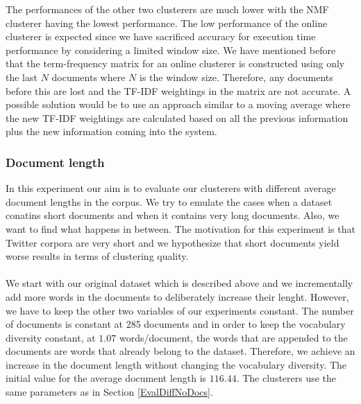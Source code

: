 The performances of the other two clusterers are much lower with the NMF clusterer having the lowest performance. The low performance of the online clusterer is expected since we have sacrificed accuracy for execution time performance by considering a limited window size. We have mentioned before that the term-frequency matrix for an online clusterer is constructed using only the last $N$ documents where $N$ is the window size. Therefore, any documents before this are lost and the TF-IDF weightings in the matrix are not accurate. A possible solution would be to use an approach similar to a moving average where the new TF-IDF weightings are calculated based on all the previous information plus the new information coming into the system.   

\subsubsection{Document length}
In this experiment our aim is to evaluate our clusterers with different average document lengths in the corpus. We try to emulate the cases when a dataset conatins short documents and when it contains very long documents. Also, we want to find what happens in between. The motivation for this experiment is that Twitter corpora are very short and we hypothesize that short documents yield worse results in terms of clustering quality.\\\\
We start with our original dataset which is described above and we incrementally add more words in the documents to deliberately increase their lenght. However, we have to keep the other two variables of our experiments constant. The number of documents is constant at 285 documents and in order to keep the vocabulary diversity constant, at $1.07$ words/document, the words that are appended to the documents are words that already belong to the dataset. Therefore, we achieve an increase in the document length without changing the vocabulary diversity. The initial value for the average document length is $116.44$. The clusterers use the same parameters as in Section \ref{EvalDiffNoDocs}.   
   
